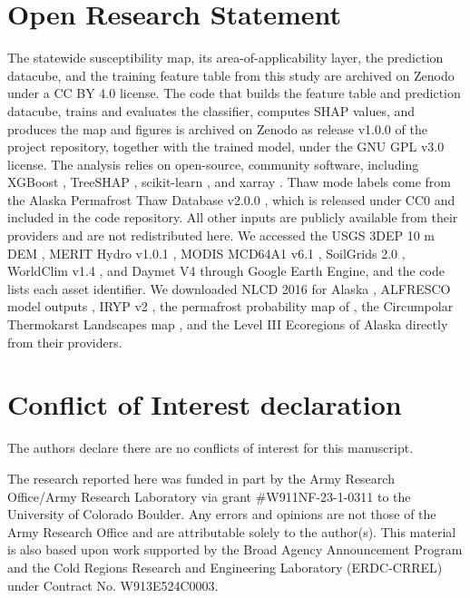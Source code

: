 \documentclass[final]{agujournal2025}
\let\citep\cite
\begin{document}
\section*{Open Research Statement}
\noindent The statewide susceptibility map, its area-of-applicability layer, the prediction datacube, and the training feature table from this study are archived on Zenodo \citep{pierce2026data} under a CC BY 4.0 license. The code that builds the feature table and prediction datacube, trains and evaluates the classifier, computes SHAP values, and produces the map and figures is archived on Zenodo \citep{pierce2026code} as release v1.0.0 of the project repository, together with the trained model, under the GNU GPL v3.0 license. The analysis relies on open-source, community software, including XGBoost \citep{chen2016xgboost}, TreeSHAP \citep{lundberg2020local}, scikit-learn \citep{pedregosa2011scikit}, and xarray \citep{hoyer2017xarray}. Thaw mode labels come from the Alaska Permafrost Thaw Database v2.0.0 \citep{webb2026thawdb_data}, which is released under CC0 and included in the code repository. All other inputs are publicly available from their providers and are not redistributed here. We accessed the USGS 3DEP 10 m DEM \citep{usgs3dep}, MERIT Hydro v1.0.1 \citep{merit_hydro}, MODIS MCD64A1 v6.1 \citep{modis_mcd64a1_061}, SoilGrids 2.0 \citep{poggio2021soilgrids}, WorldClim v1.4 \citep{worldclim_v14}, and Daymet V4 \citep{daymet_v4} through Google Earth Engine, and the code lists each asset identifier. We downloaded NLCD 2016 for Alaska \citep{dewitz2019national}, ALFRESCO model outputs \citep{alfresco}, IRYP v2 \citep{iryp_v2}, the permafrost probability map of , the Circumpolar Thermokarst Landscapes map \citep{olefeldt2015ornl}, and the Level III Ecoregions of Alaska \citep{epa_ecoregions_ak} directly from their providers.

\section*{Conflict of Interest declaration}
\noindent The authors declare there are no conflicts of interest for this manuscript.

\acknowledgments
The research reported here was funded in part by the Army Research Office/Army Research Laboratory via grant \#W911NF-23-1-0311 to the University of Colorado Boulder.  Any errors and opinions are not those of the Army Research Office and are attributable solely to the author(s). This material is also based upon work supported by the Broad Agency Announcement Program and the Cold Regions Research and Engineering Laboratory (ERDC-CRREL) under Contract No. W913E524C0003.
\end{document}
